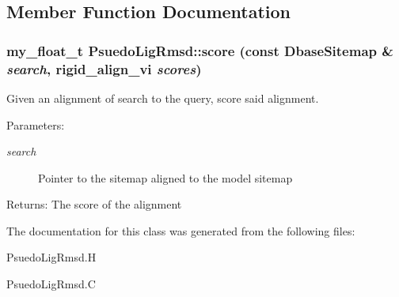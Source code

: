 \subsection{Member Function Documentation}
\subsubsection{\setlength{\rightskip}{0pt plus 5cm}my\_\-float\_\-t Psuedo\-Lig\-Rmsd::score (const \bf{Dbase\-Sitemap} \& {\em search}, rigid\_\-align\_\-vi {\em scores})\hspace{0.3cm}{\tt  [protected]}}\label{classASCbase_1_1PsuedoLigRmsd_889f9461ef48612a4d146c4b7c34b46c}


Given an alignment of search to the query, score said alignment. 

\begin{Desc}
\item[Parameters:]
\begin{description}
\item[{\em search}]Pointer to the sitemap aligned to the model sitemap \end{description}
\end{Desc}
\begin{Desc}
\item[Returns:]The score of the alignment \end{Desc}


The documentation for this class was generated from the following files:\begin{CompactItemize}
\item 
Psuedo\-Lig\-Rmsd.H\item 
Psuedo\-Lig\-Rmsd.C\end{CompactItemize}
